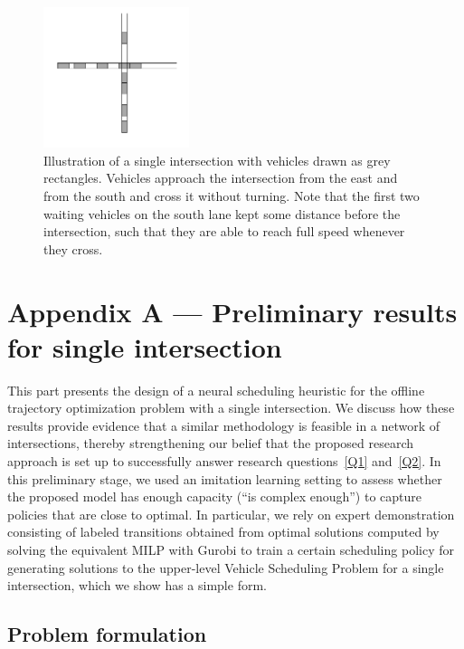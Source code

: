 \documentclass{article}
\theoremstyle{definition}
\theoremstyle{plain}
\begin{document}
\newpage
{}

\appendix

\begin{figure}
  \centering
  \includegraphics[width=0.38\textwidth]{../figures/single_intersection_example.png}
  \caption{Illustration of a single intersection with vehicles drawn as grey
    rectangles. Vehicles approach the intersection from the east and from the
    south and cross it without turning. Note that the first two waiting vehicles
    on the south lane kept some distance before the intersection, such that they
    are able to reach full speed whenever they
    cross.}\label{fig:single_intersection}
\end{figure}

\section*{Appendix A --- Preliminary results for single intersection}
\label{A}

\renewcommand{\thesection}{A}

This part presents the design of a neural scheduling heuristic for the offline
trajectory optimization problem with a single intersection. We discuss how these
results provide evidence that a similar methodology is feasible in a network of
intersections, thereby strengthening our belief that the proposed research
approach is set up to successfully answer research questions~\ref{Q1}
and~\ref{Q2}.
%
In this preliminary stage, we used an imitation learning setting to assess
whether the proposed model has enough capacity (``is complex enough'') to
capture policies that are close to optimal. In particular, we rely on expert
demonstration consisting of labeled transitions obtained from optimal solutions
computed by solving the equivalent MILP with Gurobi to train a certain
scheduling policy for generating solutions to the upper-level Vehicle Scheduling
Problem for a single intersection, which we show has a simple form.

\subsection{Problem formulation}
\label{A1}
\end{document}
